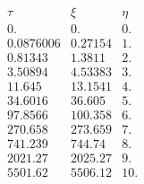 \documentclass[10pt,letterpaper]{article}
\begin{document}
		\[
		\begin{array}{ccc}
 \tau  & \xi  & \eta  \\
 0. & 0. & 0. \\
 0.0876006 & 0.27154 & 1. \\
 0.81343 & 1.3811 & 2. \\
 3.50894 & 4.53383 & 3. \\
 11.645 & 13.1541 & 4. \\
 34.6016 & 36.605 & 5. \\
 97.8566 & 100.358 & 6. \\
 270.658 & 273.659 & 7. \\
 741.239 & 744.74 & 8. \\
 2021.27 & 2025.27 & 9. \\
 5501.62 & 5506.12 & 10. \\
\end{array}
\]
\\ \\ \\
\end{document}
